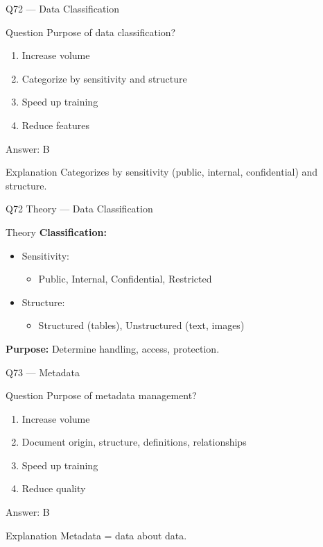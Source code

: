 \documentclass[aspectratio=169,8pt]{beamer}
\begin{document}
	\begin{frame}{Q72 --- Data Classification}
		\begin{block}{Question}
			Purpose of data classification?
		\end{block}
		\begin{enumerate}[label=\Alph*.]
			\item Increase volume
			\item Categorize by sensitivity and structure
			\item Speed up training
			\item Reduce features
		\end{enumerate}
		\begin{exampleblock}{Answer: B}
		\end{exampleblock}
		\begin{block}{Explanation}
			Categorizes by sensitivity (public, internal, confidential) and structure.
		\end{block}
	\end{frame}
	
	\begin{frame}{Q72 Theory --- Data Classification}
		\begin{block}{Theory}
			\textbf{Classification:}
			\begin{itemize}
				\item Sensitivity:
				\begin{itemize}
					\item Public, Internal, Confidential, Restricted
				\end{itemize}
				\item Structure:
				\begin{itemize}
					\item Structured (tables), Unstructured (text, images)
				\end{itemize}
			\end{itemize}
			\textbf{Purpose:} Determine handling, access, protection.
		\end{block}
	\end{frame}
	
	\begin{frame}{Q73 --- Metadata}
		\begin{block}{Question}
			Purpose of metadata management?
		\end{block}
		\begin{enumerate}[label=\Alph*.]
			\item Increase volume
			\item Document origin, structure, definitions, relationships
			\item Speed up training
			\item Reduce quality
		\end{enumerate}
		\begin{exampleblock}{Answer: B}
		\end{exampleblock}
		\begin{block}{Explanation}
			Metadata = data about data.
		\end{block}
	\end{frame}
	
\end{document}
